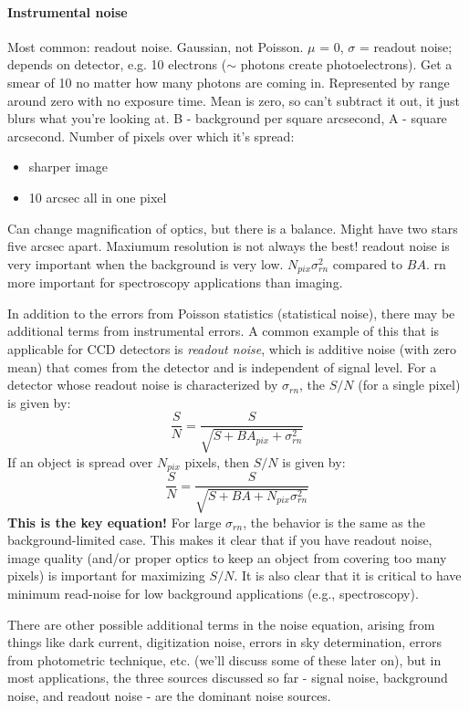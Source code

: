 \documentclass[12pt]{article}
\newcommand{\mynotes}[1]{\textcolor{myBlue}{#1}}
\begin{document}
\paragraph{Instrumental noise}
\mynotes{Most common: readout noise. Gaussian, not Poisson.
$\mu$ = 0, $\sigma$ = readout noise; depends on detector, e.g. 10
electrons ($\sim$ photons create photoelectrons). Get a smear of 10 no
matter how many photons are coming in. Represented by range around
zero with no exposure time. Mean is zero, so can't subtract it out, it
just blurs what you're looking at. B - background per square
arcsecond, A - square arcsecond. Number of pixels over which it's
spread:
\begin{itemize}
    \item sharper image
    \item 10 arcsec all in one pixel
\end{itemize}
Can change magnification of optics, but there is a balance. Might have
two stars five arcsec apart. Maxiumum resolution is not always the
best! readout noise is very important when the background is very low.
$N_{pix}\sigma_{rn}^{2}$ compared to $BA$. rn more important for
spectroscopy applications than imaging.
}

In addition to the errors from Poisson statistics (statistical noise), there
may be additional terms from instrumental errors. A common example of this that
is applicable for CCD detectors is \textit{readout noise}, which is additive
noise (with zero mean) that comes from the detector and is independent of
signal level. For a detector whose readout noise is characterized by
$\sigma_{rn}$, the $S/N$ (for a single pixel) is given by:
\[
    \frac{S}{N} = \frac{S}{\sqrt{S+BA_{pix}+\sigma^{2}_{rn}}}
    \]
If an object is spread over $N_{pix}$ pixels, then $S/N$ is given by:
\[
    \boxed{
    \frac{S}{N} = \frac{S}{\sqrt{S+BA+N_{pix}\sigma^{2}_{rn}}} }
    \]
\mynotes{\textbf{This is the key equation!}}
For large $\sigma_{rn}$, the behavior is the same as the background-limited
case. This makes it clear that if you have readout noise, image quality (and/or
proper optics to keep an object from covering too many pixels) is important for
maximizing $S/N$. It is also clear that it is critical to have minimum
read-noise for low background applications (e.g., spectroscopy).

There are other possible additional terms in the noise equation, arising from
things like dark current, digitization noise, errors in sky determination,
errors from photometric technique, etc. (we'll discuss some of these later on),
but in most applications, the three sources discussed so far - signal noise,
background noise, and readout noise - are the dominant noise sources.
\end{document}
